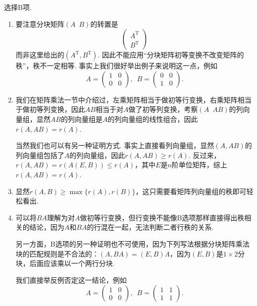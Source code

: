 \begin{solution}
    选择B项.
    \begin{enumerate}[label=\Alph*.]
        \item 要注意分块矩阵$(A\enspace B)$的转置是
              \[\begin{pmatrix}
                      A^\mathrm{T} \\ B^\mathrm{T}
                  \end{pmatrix}\]
              而非这里给出的$(A^\mathrm{T}, B^\mathrm{T})$. 因此不能应用``分块矩阵初等变换不改变矩阵的秩''，秩不一定相等. 事实上我们很好举出例子来说明这一点，例如
              \[A=\begin{pmatrix}
                      1 & 0 \\ 0 & 0
                  \end{pmatrix},\enspace B=\begin{pmatrix}
                      0 & 0 \\ 1 & 0
                  \end{pmatrix}.\]

        \item 我们在矩阵乘法一节中介绍过，左乘矩阵相当于做初等行变换，右乘矩阵相当于做初等列变换，因此$AB$相当于对$A$做了初等列变换，考察$(A\enspace AB)$的列向量组，显然$AB$的列向量组是$A$的列向量组的线性组合，因此$r(A,AB)=r(A)$.

              当然我们也可以有另一种证明方式. 事实上直接看列向量组，显然$(A,AB)$的列向量组包括了$A$的列向量组，因此$r(A,AB)\geqslant r(A)$. 反过来，$r(A,AB)=r(A(E,B))\leqslant r(A)$，其中$E$是$n$阶单位矩阵，综上$r(A,AB)=r(A)$.

        \item 显然$r(A,B)\geqslant \max\{r(A), r(B)\}$，这只需要看矩阵列向量组的秩即可轻松看出.

        \item 可以将$BA$理解为对$A$做初等行变换，但行变换不能像B选项那样直接得出秩相关的结论，因为$A$和$BA$的行混在一起，无法判断二者行秩的关系.

              另一方面，B选项的另一种证明也不可使用，因为下列写法根据分块矩阵乘法块的匹配规则是不合法的：$(A,BA)=(E,B)A$，因为$(E,B)$是$1\times 2$分块，后面应该乘以一个两行分块.

              我们直接举反例否定这一结论，例如
              \[A=\begin{pmatrix}
                      1 & 0 \\ 0 & 0
                  \end{pmatrix},\enspace B=\begin{pmatrix}
                      1 & 1 \\ 1 & 1
                  \end{pmatrix}.\]
    \end{enumerate}
\end{solution}

